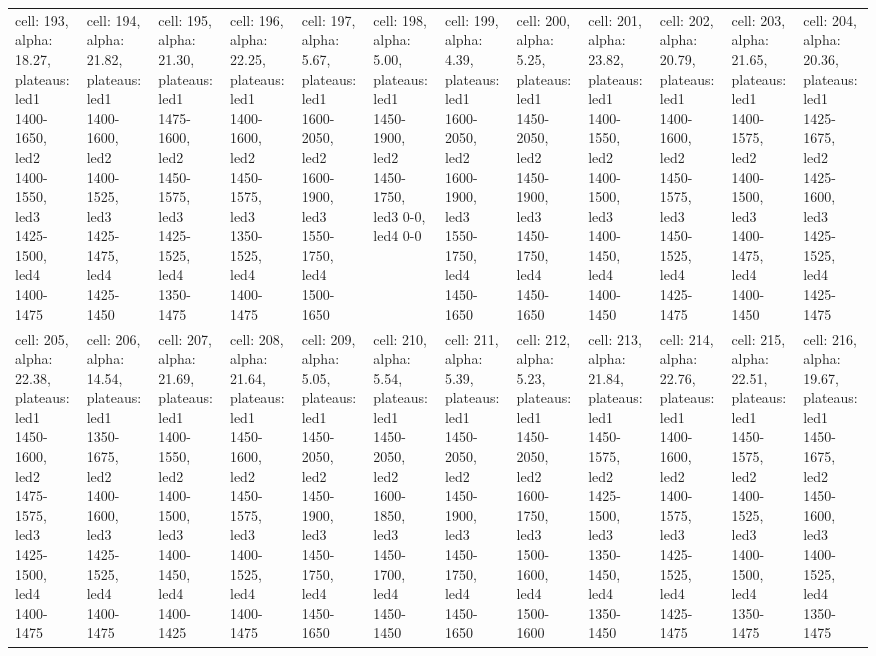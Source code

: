 \begin{landscape}
\begin{longtable}{|l|l|l|l|l|l|l|l|l|l|l|l|}
\rowcolor{lightgray} cell: 193, alpha: 18.27, plateaus: led1 1400-1650, led2 1400-1550, led3 1425-1500, led4 1400-1475 &cell: 194, alpha: 21.82, plateaus: led1 1400-1600, led2 1400-1525, led3 1425-1475, led4 1425-1450 &cell: 195, alpha: 21.30, plateaus: led1 1475-1600, led2 1450-1575, led3 1425-1525, led4 1350-1475 &cell: 196, alpha: 22.25, plateaus: led1 1400-1600, led2 1450-1575, led3 1350-1525, led4 1400-1475 &cell: 197, alpha: 5.67, plateaus: led1 1600-2050, led2 1600-1900, led3 1550-1750, led4 1500-1650 &cell: 198, alpha: 5.00, plateaus: led1 1450-1900, led2 1450-1750, led3 0-0, led4 0-0 &cell: 199, alpha: 4.39, plateaus: led1 1600-2050, led2 1600-1900, led3 1550-1750, led4 1450-1650 &cell: 200, alpha: 5.25, plateaus: led1 1450-2050, led2 1450-1900, led3 1450-1750, led4 1450-1650 &cell: 201, alpha: 23.82, plateaus: led1 1400-1550, led2 1400-1500, led3 1400-1450, led4 1400-1450 &cell: 202, alpha: 20.79, plateaus: led1 1400-1600, led2 1450-1575, led3 1450-1525, led4 1425-1475 &cell: 203, alpha: 21.65, plateaus: led1 1400-1575, led2 1400-1500, led3 1400-1475, led4 1400-1450 &cell: 204, alpha: 20.36, plateaus: led1 1425-1675, led2 1425-1600, led3 1425-1525, led4 1425-1475 \\
cell: 205, alpha: 22.38, plateaus: led1 1450-1600, led2 1475-1575, led3 1425-1500, led4 1400-1475 &cell: 206, alpha: 14.54, plateaus: led1 1350-1675, led2 1400-1600, led3 1425-1525, led4 1400-1475 &cell: 207, alpha: 21.69, plateaus: led1 1400-1550, led2 1400-1500, led3 1400-1450, led4 1400-1425 &cell: 208, alpha: 21.64, plateaus: led1 1450-1600, led2 1450-1575, led3 1400-1525, led4 1400-1475 &cell: 209, alpha: 5.05, plateaus: led1 1450-2050, led2 1450-1900, led3 1450-1750, led4 1450-1650 &cell: 210, alpha: 5.54, plateaus: led1 1450-2050, led2 1600-1850, led3 1450-1700, led4 1450-1450 &cell: 211, alpha: 5.39, plateaus: led1 1450-2050, led2 1450-1900, led3 1450-1750, led4 1450-1650 &cell: 212, alpha: 5.23, plateaus: led1 1450-2050, led2 1600-1750, led3 1500-1600, led4 1500-1600 &cell: 213, alpha: 21.84, plateaus: led1 1450-1575, led2 1425-1500, led3 1350-1450, led4 1350-1450 &cell: 214, alpha: 22.76, plateaus: led1 1400-1600, led2 1400-1575, led3 1425-1525, led4 1425-1475 &cell: 215, alpha: 22.51, plateaus: led1 1450-1575, led2 1400-1525, led3 1400-1500, led4 1350-1475 &cell: 216, alpha: 19.67, plateaus: led1 1450-1675, led2 1450-1600, led3 1400-1525, led4 1350-1475 \\

\end{longtable}
\end{landscape}
